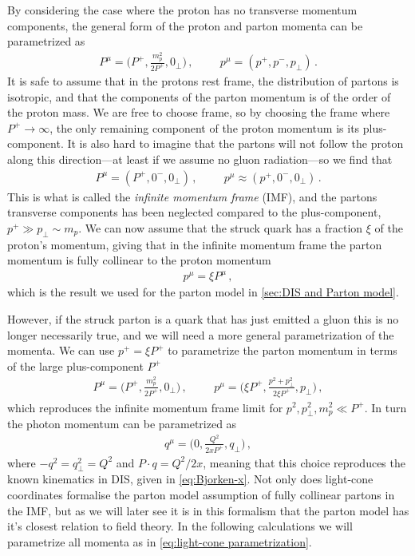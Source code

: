 By considering the case where the proton has no transverse momentum components, the general form of the proton and parton momenta can be parametrized as
\begin{align}
    P^{\mu}=\Big(P^{+},\frac{m_{p}^{2}}{2P^{+}},0_{\perp}\Big)\,,\hspace{1cm}
    p^{\mu}=(p^{+},p^{-},p_{\perp})\,.
\end{align}
It is safe to assume that in the protons rest frame, the distribution of partons is isotropic, and that the components of the parton momentum is of the order of the proton mass. We are free to choose frame, so by choosing the frame where $P^{+}\rightarrow \infty$, the only remaining component of the proton momentum is its plus-component. It is also hard to imagine that the partons will not follow the proton along this direction---at least if we assume no gluon radiation---so we find that
\begin{align}
    P^{\mu}=(P^{+},0^{-},0_{\perp})\,,\hspace{1cm}
    p^{\mu}\approx(p^{+},0^{-},0_{\perp})\,.
\end{align}
This is what is called the \emph{infinite momentum frame} (IMF), and the partons transverse components has been neglected compared to the plus-component, $p^{+}\gg p_{\perp}\sim m_{p}$. We can now assume that the struck quark has a fraction $\xi$ of the proton's momentum, giving that in the infinite momentum frame the parton momentum is fully collinear to the proton momentum
\begin{align}
    p^{\mu}=\xi P^{\mu}\,,
\end{align}
which is the result we used for the parton model in \cref{sec:DIS and Parton model}. 

However, if the struck parton is a quark that has just emitted a gluon this is no longer necessarily true, and we will need a more general parametrization of the momenta. We can use $p^{+}=\xi P^{+}$ to parametrize the parton momentum in terms of the large plus-component $P^{+}$
\begin{align}\label{eq:light-cone parametrization}
    P^{\mu}=\Big(P^{+},\frac{m_{p}^{2}}{2P^{+}},0_{\perp}\Big)\,,\hspace{1cm}p^{\mu}=\Big(\xi P^{+},\frac{p^{2}+p_{\perp}^{2}}{2\xi P^{+}},p_{\perp}\Big)\,,
\end{align}
which reproduces the infinite momentum frame limit for $p^{2},p_{\perp}^{2},m_{p}^{2}\ll P^{+}$. In turn the photon momentum can be parametrized as
\begin{align}\label{eq:light-cone photon momenta}
    q^{\mu}=\Big(0,\frac{Q^{2}}{2xP^{+}},q_{\perp}\Big)\,,
\end{align}
where $-q^{2}=q_{\perp}^{2}=Q^{2}$ and $P\cdot q=Q^{2}/2x$, meaning that this choice reproduces the known kinematics in DIS, given in \cref{eq:Bjorken-x}. Not only does light-cone coordinates formalise the parton model assumption of fully collinear partons in the IMF, but as we will later see it is in this formalism that the parton model has it's closest relation to field theory. In the following calculations we will parametrize all momenta as in \cref{eq:light-cone parametrization}.

